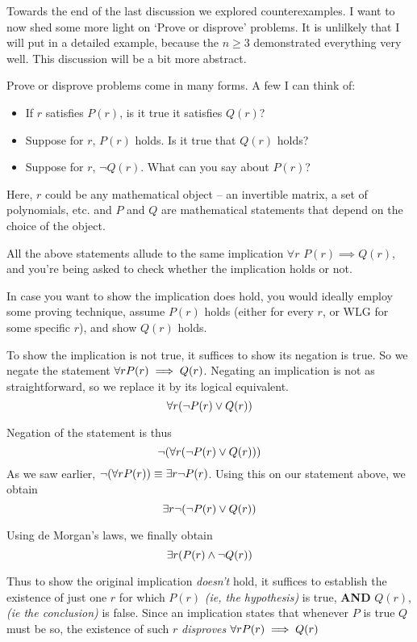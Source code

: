 

Towards the end of the last discussion we explored counterexamples. I want to now shed some more light on `Prove or disprove' problems. It is unlilkely that I will put in a detailed example, because the $n \geq 3$ demonstrated everything very well. This discussion will be a bit more abstract.

Prove or disprove problems come in many forms. A few I can think of:
\begin{itemize}
    \item If $r$ satisfies $P(r)$, is it true it satisfies $Q(r)$?
    \item Suppose for $r$, $P(r)$ holds. Is it true that $Q(r)$ holds?
    \item Suppose for $r$, $\neg Q(r)$. What can you say about $P(r)$?
\end{itemize}

Here, $r$ could be any mathematical object -- an invertible matrix, a set of polynomials, etc. and $P$ and $Q$ are mathematical statements that depend on the choice of the object.

All the above statements allude to the same implication $\forall r$ $P(r) \implies Q(r)$, and you're being asked to check whether the implication holds or not.

In case you want to show the implication does hold, you would ideally employ some proving technique, assume $P(r)$ holds (either for every $r$, or WLG for some specific $r$), and show $Q(r)$ holds.

To show the implication is not true, it suffices to show its negation is true. So we negate the statement $\forall r \space P(r) \implies Q(r)$. Negating an implication is not as straightforward, so we replace it by its logical equivalent.
$$\forall r \space (\neg P(r) \vee Q(r))$$

Negation of the statement is thus
$$\neg(\forall r \space (\neg P(r) \vee Q(r)))$$
As we saw earlier, $\neg (\forall r \space P(r)) \equiv \exists r \space \neg P(r)$. Using this on our statement above, we obtain
$$\exists r \space \neg (\neg P(r) \vee Q(r))$$

Using de Morgan's laws, we finally obtain
$$\exists r \space (P(r) \wedge \neg Q(r))$$

Thus to show the original implication \textit{doesn't} hold, it suffices to establish the existence of just one $r$ for which $P(r)$ \textit{(ie, the hypothesis)} is true, \textbf{AND} $Q(r)$, \textit{(ie the conclusion)} is false. Since an implication states that whenever $P$ is true $Q$ must be so, the existence of such $r$ \textit{disproves} $\forall r \space P(r) \implies Q(r)$

